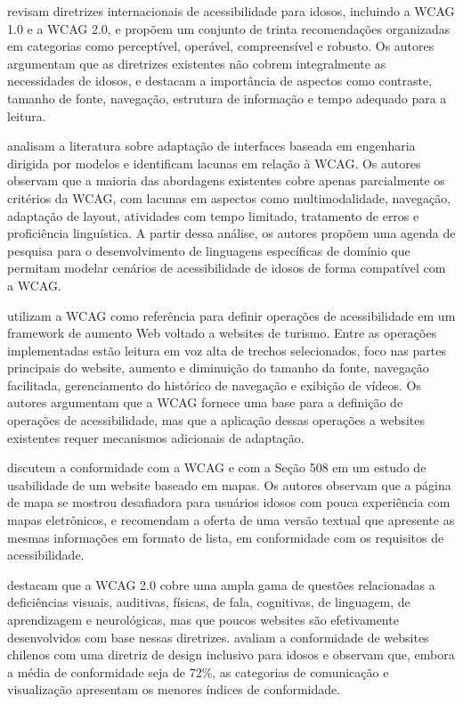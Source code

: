 \cite{sun2010preliminary} revisam diretrizes internacionais de acessibilidade para idosos, incluindo a WCAG 1.0 e a WCAG 2.0, e propõem um conjunto de trinta recomendações organizadas em categorias como perceptível, operável, compreensível e robusto. Os autores argumentam que as diretrizes existentes não cobrem integralmente as necessidades de idosos, e destacam a importância de aspectos como contraste, tamanho de fonte, navegação, estrutura de informação e tempo adequado para a leitura.

\cite{wickramathilaka2023addressing} analisam a literatura sobre adaptação de interfaces baseada em engenharia dirigida por modelos e identificam lacunas em relação à WCAG. Os autores observam que a maioria das abordagens existentes cobre apenas parcialmente os critérios da WCAG, com lacunas em aspectos como multimodalidade, navegação, adaptação de layout, atividades com tempo limitado, tratamento de erros e proficiência linguística. A partir dessa análise, os autores propõem uma agenda de pesquisa para o desenvolvimento de linguagens específicas de domínio que permitam modelar cenários de acessibilidade de idosos de forma compatível com a WCAG.

\cite{gonzalez2025augmenting} utilizam a WCAG como referência para definir operações de acessibilidade em um framework de aumento Web voltado a websites de turismo. Entre as operações implementadas estão leitura em voz alta de trechos selecionados, foco nas partes principais do website, aumento e diminuição do tamanho da fonte, navegação facilitada, gerenciamento do histórico de navegação e exibição de vídeos. Os autores argumentam que a WCAG fornece uma base para a definição de operações de acessibilidade, mas que a aplicação dessas operações a websites existentes requer mecanismos adicionais de adaptação.

\cite{xie2010usability} discutem a conformidade com a WCAG e com a Seção 508 em um estudo de usabilidade de um website baseado em mapas. Os autores observam que a página de mapa se mostrou desafiadora para usuários idosos com pouca experiência com mapas eletrônicos, e recomendam a oferta de uma versão textual que apresente as mesmas informações em formato de lista, em conformidade com os requisitos de acessibilidade.

\cite{ahmad2013teaching} destacam que a WCAG 2.0 cobre uma ampla gama de questões relacionadas a deficiências visuais, auditivas, físicas, de fala, cognitivas, de linguagem, de aprendizagem e neurológicas, mas que poucos websites são efetivamente desenvolvidos com base nessas diretrizes. \cite{dombrovskaia2021guideline} avaliam a conformidade de websites chilenos com uma diretriz de design inclusivo para idosos e observam que, embora a média de conformidade seja de 72\%, as categorias de comunicação e visualização apresentam os menores índices de conformidade.

